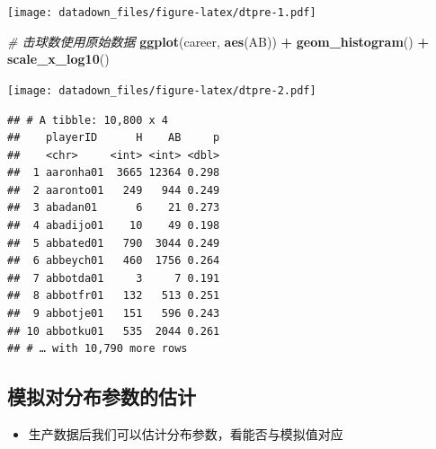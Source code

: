 \documentclass[]{book}
\newenvironment{Shaded}{\begin{snugshade}}{\end{snugshade}}
\newcommand{\CommentTok}[1]{\textcolor[rgb]{0.56,0.35,0.01}{\textit{#1}}}
\newcommand{\DataTypeTok}[1]{\textcolor[rgb]{0.13,0.29,0.53}{#1}}
\newcommand{\DecValTok}[1]{\textcolor[rgb]{0.00,0.00,0.81}{#1}}
\newcommand{\KeywordTok}[1]{\textcolor[rgb]{0.13,0.29,0.53}{\textbf{#1}}}
\newcommand{\NormalTok}[1]{#1}
\newcommand{\OperatorTok}[1]{\textcolor[rgb]{0.81,0.36,0.00}{\textbf{#1}}}
\newcommand{\StringTok}[1]{\textcolor[rgb]{0.31,0.60,0.02}{#1}}
\providecommand{\tightlist}{%
  \setlength{\itemsep}{0pt}\setlength{\parskip}{0pt}}
\begin{document}
\texttt{[image: datadown\_files/figure-latex/dtpre-1.pdf]}

\begin{Shaded}
\begin{Highlighting}[]
\CommentTok{# 击球数使用原始数据}
\KeywordTok{ggplot}\NormalTok{(career, }\KeywordTok{aes}\NormalTok{(AB)) }\OperatorTok{+}
\StringTok{  }\KeywordTok{geom_histogram}\NormalTok{() }\OperatorTok{+}
\StringTok{  }\KeywordTok{scale_x_log10}\NormalTok{()}
\end{Highlighting}
\end{Shaded}

\texttt{[image: datadown\_files/figure-latex/dtpre-2.pdf]}

\begin{Shaded}
\end{Shaded}

\begin{verbatim}
## # A tibble: 10,800 x 4
##    playerID      H    AB     p
##    <chr>     <int> <int> <dbl>
##  1 aaronha01  3665 12364 0.298
##  2 aaronto01   249   944 0.249
##  3 abadan01      6    21 0.273
##  4 abadijo01    10    49 0.198
##  5 abbated01   790  3044 0.249
##  6 abbeych01   460  1756 0.264
##  7 abbotda01     3     7 0.191
##  8 abbotfr01   132   513 0.251
##  9 abbotje01   151   596 0.243
## 10 abbotku01   535  2044 0.261
## # … with 10,790 more rows
\end{verbatim}

\hypertarget{ux6a21ux62dfux5bf9ux5206ux5e03ux53c2ux6570ux7684ux4f30ux8ba1}{%
\subsection{模拟对分布参数的估计}\label{ux6a21ux62dfux5bf9ux5206ux5e03ux53c2ux6570ux7684ux4f30ux8ba1}}

\begin{itemize}
\tightlist
\item
  生产数据后我们可以估计分布参数，看能否与模拟值对应
\end{itemize}
\end{document}
